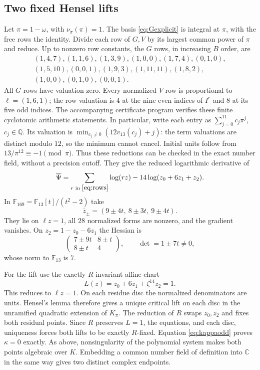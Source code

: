 \documentclass[11pt]{article}
\theoremstyle{remark}\newtheorem{remark}[theorem]{Remark}
\newcommand{\C}{\mathbb C}\newcommand{\Q}{\mathbb Q}
\newcommand{\F}{\mathbb F}\newcommand{\Z}{\mathbb Z}
\begin{document}
\subsection{Two fixed Hensel lifts}
Let $\pi=1-\omega$, with $\nu_\pi(\pi)=1$. The basis
\eqref{eq:Gexplicit} is integral at $\pi$, with the free rows the identity.
Divide each row of $G,V$ by its largest common power of $\pi$ and reduce.
Up to nonzero row constants, the $G$ rows, in increasing $B$ order, are
\begin{equation}\label{eq:rows}
\begin{gathered}
(1,4,7),(1,1,6),(1,3,9),(1,0,0),(1,7,4),(0,1,0),\\
(1,5,10),(0,0,1),(1,9,3),(1,11,11),(1,8,2),\\
(1,0,0),(0,1,0),(0,0,1).
\end{gathered}
\end{equation}
All $G$ rows have valuation zero. Every normalized $V$ row is proportional
to $\ell=(1,6,1)$; the row valuation is $4$ at the nine even indices
of $I^c$ and $8$ at its five odd indices. The accompanying certificate
program verifies these finite cyclotomic arithmetic statements. In particular,
write each entry as $\sum_{j=0}^{11}c_j\pi^j$, $c_j\in\Q$. Its valuation is
$\min_{c_j\ne0}(12v_{13}(c_j)+j)$: the term valuations are distinct modulo
$12$, so the minimum cannot cancel. Initial units follow from
$13/\pi^{12}\equiv-1\pmod\pi$. Thus these reductions can be checked in
the exact number field, without a precision cutoff. They give
the reduced logarithmic derivative of
\[
 \overline\Psi=\sum_{r\text{ in }\eqref{eq:rows}}\log(rz)
                   -14\log(z_0+6z_1+z_2).
\]
In $\F_{169}=\F_{13}[t]/(t^2-2)$ take
\[
 \bar z_\pm=(9\pm4t,\ 8\pm3t,\ 9\pm4t).
\]
They lie on $\ell z=1$, all $28$ normalized forms are nonzero, and the
gradient vanishes. On $z_2=1-z_0-6z_1$ the Hessian is
\[
 \begin{pmatrix}7\pm9t&8\pm t\\8\pm t&4\end{pmatrix},
 \qquad \det=1\pm7t\ne0,
\]
whose norm to $\F_{13}$ is $7$.

For the lift use the exactly $R$-invariant affine chart
\[
 L(z)=z_0+6z_1+\zeta^{14}z_2=1.
\]
This reduces to $\ell z=1$. On each residue disc the normalized
denominators are units. Hensel's lemma therefore gives a unique critical
lift on each disc in the unramified quadratic extension of $K_\pi$.
The reduction of $R$ swaps $z_0,z_2$ and fixes both residual points.
Since $R$ preserves $L=1$, the equations, and each disc, uniqueness forces
both lifts to be exactly $R$-fixed. Equation \eqref{eq:kappaodd} proves
$\kappa=0$ exactly. As above, nonsingularity of the polynomial system
makes both points algebraic over $K$. Embedding a common number field
of definition into $\C$ in the same way gives two distinct complex endpoints.
\end{document}
